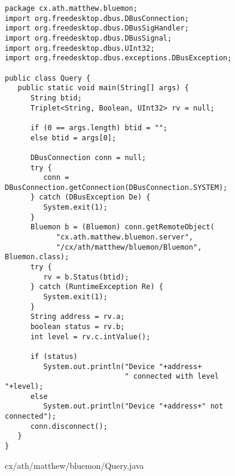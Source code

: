 \documentclass[a4paper,12pt]{article}
\begin{document}
\newpage

\begin{figure}[!h]
\begin{center}
\begin{verbatim}
package cx.ath.matthew.bluemon;
import org.freedesktop.dbus.DBusConnection;
import org.freedesktop.dbus.DBusSigHandler;
import org.freedesktop.dbus.DBusSignal;
import org.freedesktop.dbus.UInt32;
import org.freedesktop.dbus.exceptions.DBusException;

public class Query {
   public static void main(String[] args) {
      String btid;
      Triplet<String, Boolean, UInt32> rv = null;
      
      if (0 == args.length) btid = "";
      else btid = args[0];
      
      DBusConnection conn = null;
      try {
         conn = DBusConnection.getConnection(DBusConnection.SYSTEM);
      } catch (DBusException De) {
         System.exit(1);
      }     
      Bluemon b = (Bluemon) conn.getRemoteObject(
            "cx.ath.matthew.bluemon.server", 
            "/cx/ath/matthew/bluemon/Bluemon", Bluemon.class);
      try {
         rv = b.Status(btid);
      } catch (RuntimeException Re) {
         System.exit(1);
      }
      String address = rv.a;
      boolean status = rv.b;
      int level = rv.c.intValue();

      if (status)
         System.out.println("Device "+address+
                            " connected with level "+level);
      else
         System.out.println("Device "+address+" not connected");
      conn.disconnect();
   }
}
\end{verbatim}
\end{center}
\caption{cx/ath/matthew/bluemon/Query.java}
\end{figure}

\newpage
\end{document}
